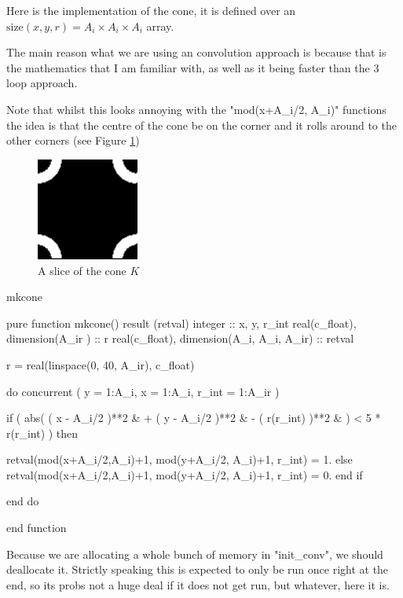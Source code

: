 \documentclass[10pt, a4paper]{article}
\begin{document}
Here is the implementation of the cone, it is defined over an $\text{size}(x,y,r) = A_i \times A_i \times A_i$ array. 

The main reason what we are using an convolution approach is because that is the mathematics that I am familiar with, as well as it being faster than the 3 loop approach.

Note that whilst this looks annoying with the "mod(x+A_i/2, A_i)" functions the idea is that the centre of the cone be on the corner and it rolls around to the other corners (see Figure \ref{fig:k})

\begin{figure}[h]
\centering
\includegraphics[width=0.3\textwidth]{Images/circ.png}
\caption{A slice of the cone $K$}
\label{fig:k}
\end{figure}

\begin{codeblock}{mkcone}
\begin{code}
pure function mkcone() result (retval)
	integer :: x, y, r_int 
	real(c_float), dimension(A_ir ) :: r
	real(c_float), dimension(A_i, A_i, A_ir) :: retval
	
	r = real(linspace(0, 40, A_ir), c_float)
	
	do concurrent ( y = 1:A_i, x = 1:A_i, r_int = 1:A_ir )
	
		if ( abs(   ( x - A_i/2 )**2  &
		          + ( y - A_i/2 )**2  &
		          - ( r(r_int) )**2 &
		        ) < 5 * r(r_int) ) then 
			
			retval(mod(x+A_i/2,A_i)+1, mod(y+A_i/2, A_i)+1, r_int) = 1.
		else
			retval(mod(x+A_i/2,A_i)+1, mod(y+A_i/2, A_i)+1, r_int) = 0.
		end if 
		
	end do
	
end function
\end{code}
\end{codeblock}

Because we are allocating a whole bunch of memory in "init_conv", we should deallocate it. 
Strictly speaking this is expected to only be run once right at the end, so its probs not a huge deal if it does not get run, but whatever, here it is. 
\end{document}
